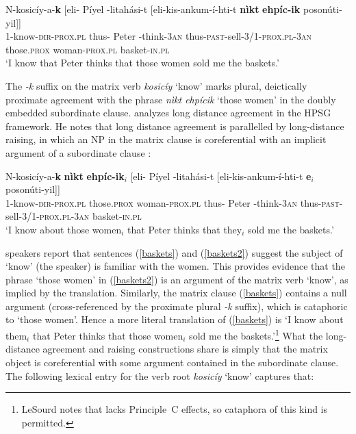 \documentclass[output=paper
	        ,collection
	        ,collectionchapter
 	        ,biblatex
                ,babelshorthands
                ,newtxmath
                ,draftmode
                ,colorlinks, citecolor=brown
]{langscibook}
\begin{document}
\begin{exe}
\ex\label{baskets}
\gll N-kosic\'{i}y-a-\textbf{k}  [eli- P\'{i}yel -litah\'{a}si-t           {[eli-kis-ankum-\'{i}-hti-t}   \textbf{n\`{i}kt}  \textbf{ehp\'{i}c-ik}	{poson\'{u}ti-yil]]} \\
     1-know-\textsc{dir-prox.pl} \spacebr{}thus- Peter -think-\textsc{3an} { \spacebr{}thus-\textsc{past}-sell-\textsc{3/1-prox.pl-3an}}         those.\textsc{prox}  woman-\textsc{prox.pl}     basket-\textsc{in.pl}\\
\glt `I know that Peter thinks that those women sold me the baskets.’
\end{exe}

\noindent
The \textit{-k} suffix on the matrix verb \textit{kosic\'{i}y} `know' marks plural, deictically proximate agreement with the phrase \textit{n\`{i}kt ehp\'{i}cik} `those women'  in the doubly embedded subordinate clause.  \citet{LeSourd:2018} analyzes  long distance agreement in the HPSG framework.   He notes that   long distance agreement is parallelled by long-distance raising, in which an NP in the matrix clause is coreferential with an implicit argument of a subordinate clause \citep[example\,(4)]{LeSourd:2018}:  

\begin{exe}
\ex\label{baskets2}
\gll N-kosic\'{i}y-a-\textbf{k} \textbf{n\`{i}kt}  \textbf{ehp\'{i}c-ik}$_i$ [eli- P\'{i}yel -litah\'{a}si-t  [eli-kis-ankum-\'{i}-hti-t  \textbf{e$_i$} 	{poson\'{u}ti-yil]]} \\
     1-know-\textsc{dir-prox.pl} those.\textsc{prox}  woman-\textsc{prox.pl} \spacebr{}thus- Peter -think-\textsc{3an} \spacebr{}thus-\textsc{past}-sell-\textsc{3/1-prox.pl-3an}         {}    basket-\textsc{in.pl}\\
\glt `I know about those women$_i$ that Peter thinks that they$_i$ sold me the baskets.’
\end{exe}

\noindent
{} speakers report that sentences (\ref{baskets}) and (\ref{baskets2}) suggest the subject of `know' (the speaker) is familiar with the women.  This provides evidence that the phrase `those women' in (\ref{baskets2}) is an argument of the matrix verb `know', as implied by the translation.  
Similarly, the matrix clause (\ref{baskets}) contains a null argument (cross-referenced by the proximate plural \textit{-k}  suffix), which is  cataphoric to `those women'.  Hence a more literal translation of (\ref{baskets}) is `I know about them$_i$ that Peter thinks that those women$_i$ sold me the baskets.'\footnote{LeSourd notes that  lacks Principle~C effects, so cataphora of this kind is permitted.}  What the long-distance agreement and raising constructions share is simply that the matrix object is coreferential with some argument contained in the subordinate clause.  The following lexical entry for the verb root \textit{kosic\'{i}y} `know' captures that:
\end{document}
